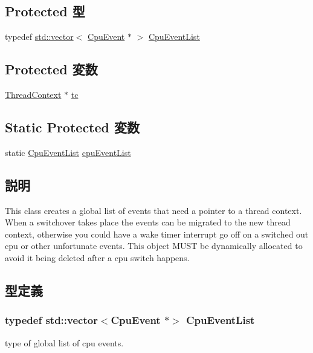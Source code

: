 \subsection*{Protected 型}
\begin{DoxyCompactItemize}
\item 
typedef \hyperlink{classstd_1_1vector}{std::vector}$<$ \hyperlink{classCpuEvent}{CpuEvent} $\ast$ $>$ \hyperlink{classCpuEvent_a87e3068498bf2fb68a7723d38bd194f3}{CpuEventList}
\end{DoxyCompactItemize}
\subsection*{Protected 変数}
\begin{DoxyCompactItemize}
\item 
\hyperlink{classThreadContext}{ThreadContext} $\ast$ \hyperlink{classCpuEvent_a4455a4759e69e5ebe68ae7298cbcc37d}{tc}
\end{DoxyCompactItemize}
\subsection*{Static Protected 変数}
\begin{DoxyCompactItemize}
\item 
static \hyperlink{classstd_1_1vector}{CpuEventList} \hyperlink{classCpuEvent_a8117445cf117d748705531a5145dc9f7}{cpuEventList}
\end{DoxyCompactItemize}


\subsection{説明}
This class creates a global list of events that need a pointer to a thread context. When a switchover takes place the events can be migrated to the new thread context, otherwise you could have a wake timer interrupt go off on a switched out cpu or other unfortunate events. This object MUST be dynamically allocated to avoid it being deleted after a cpu switch happens. 

\subsection{型定義}
\hypertarget{classCpuEvent_a87e3068498bf2fb68a7723d38bd194f3}{
\subsubsection[{CpuEventList}]{\setlength{\rightskip}{0pt plus 5cm}typedef {\bf std::vector}$<${\bf CpuEvent} $\ast$$>$ {\bf CpuEventList}}}
\label{classCpuEvent_a87e3068498bf2fb68a7723d38bd194f3}
type of global list of cpu events. 

